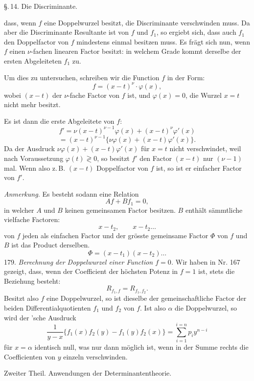 \S.\,14. Die Discriminante.

dass, wenn $f$ eine Doppelwurzel besitzt, die Discriminante verschwinden
muss. Da aber die Discriminante Resultante ist von $f$ und $f_1$, so ergiebt
sich, dass auch $f_1$ den Doppelfactor von $f$ mindestens einmal
besitzen muss. Es frägt sich nun, wenn $f$ einen $\nu$-fachen linearen
Factor besitzt: in welchem Grade kommt derselbe der ersten Abgeleiteten $f_1$ zu.

Um dies zu untersuchen, schreiben wir die Function $f$ in der Form:
\[
f = (x-t)^\nu \cdot \varphi(x),
\]
wobei $(x-t)$ der $\nu$-fache Factor von $f$ ist, und $\varphi(x)=0$, die
Wurzel $x=t$ nicht mehr besitzt.

Es ist dann die erste Abgeleitete von $f$:
\[
f' = \nu (x-t)^{\nu-1} \varphi(x) + (x-t)^\nu \varphi'(x)
\]
\[
= (x-t)^{\nu-1} \{\nu \varphi(x) + (x-t) \varphi'(x)\}.
\]
Da der Ausdruck $\nu \varphi(x) + (x-t)\varphi'(x)$ für $x=t$ nicht verschwindet,
weil nach Voraussetzung $\varphi(t) \gtrless 0$, so besitzt $f'$ den Factor $(x-t)$
nur $(\nu-1)$mal. Wenn also z.\,B. $(x-t)$ Doppelfactor von $f$ ist, so
ist er einfacher Factor von $f'$.

\textit{Anmerkung.} Es besteht sodann eine Relation
\[
Af + Bf_1 = 0,
\]
in welcher $A$ und $B$ keinen gemeinsamen Factor besitzen. $B$ enthält
sämmtliche vielfache Factoren:
\[
x - t_2, \qquad x - t_2 \ldots %
\]
von $f$ jeden als einfachen Factor und der grösste gemeinsame Factor $\Phi$
von $f$ und $B$ ist das Product derselben.
\[
\Phi = (x-t_1)(x-t_2) \ldots
\]
179. \textit{Berechnung der Doppelwurzel einer Function $f=0$.} Wir
haben in Nr. 167 gezeigt, dass, wenn der Coefficient der höchsten
Potenz in $f=1$ ist, stets die Beziehung besteht:
\[
R_{f_1,f} = R_{f_1,f_2}.
\]
Besitzt also $f$ eine Doppelwurzel, so ist dieselbe der gemeinschaftliche Factor der beiden Differentialquotienten $f_1$ und $f_2$ von $f$.
Ist also $\alpha$ die Doppelwurzel, so wird der 'sche Ausdruck
\[
\frac{1}{y-x} \{f_1(x)f_2(y) - f_1(y)f_2(x)\} = \sum_{i=1}^{i=n} p_i y^{n-i}
\]
für $x=\alpha$ identisch null, was nur dann möglich ist, wenn in der
Summe rechts die Coefficienten von $y$ einzeln verschwinden.


Zweiter Theil. Anwendungen der Determinantentheorie.

